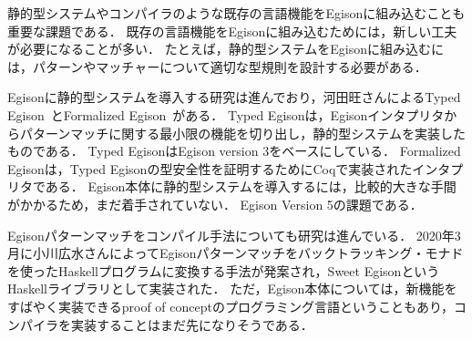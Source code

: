 静的型システムやコンパイラのような既存の言語機能をEgisonに組み込むことも重要な課題である．
既存の言語機能をEgisonに組み込むためには，新しい工夫が必要になることが多い．
たとえば，静的型システムをEgisonに組み込むには，パターンやマッチャーについて適切な型規則を設計する必要がある．

Egisonに静的型システムを導入する研究は進んでおり，河田旺さんによるTyped Egison~\cite{typedEgison}とFormalized Egison~\cite{formalizedEgison}がある．
Typed Egisonは，Egisonインタプリタからパターンマッチに関する最小限の機能を切り出し，静的型システムを実装したものである．
Typed EgisonはEgison version 3をベースにしている．
Formalized Egisonは，Typed Egisonの型安全性を証明するためにCoqで実装されたインタプリタである．
Egison本体に静的型システムを導入するには，比較的大きな手間がかかるため，まだ着手されていない．
Egison Version 5の課題である．

Egisonパターンマッチをコンパイル手法についても研究は進んでいる．
2020年3月に小川広水さんによってEgisonパターンマッチをバックトラッキング・モナドを使ったHaskellプログラムに変換する手法が発案され，Sweet Egison\cite{sweetEgison}というHaskellライブラリとして実装された．
ただ，Egison本体については，新機能をすばやく実装できるproof of conceptのプログラミング言語ということもあり，コンパイラを実装することはまだ先になりそうである．

